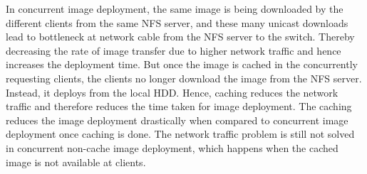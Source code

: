 \documentclass[a4paper,12pt]{article}
\begin{document}
In concurrent image deployment, the same image is being downloaded by the different clients from the same NFS server, and these many unicast downloads lead to bottleneck at network cable from the NFS server to the switch. Thereby decreasing the rate of image transfer due to higher network traffic and hence increases the deployment time. But once the image is cached in the concurrently requesting clients, the clients no longer download the image from the NFS server. Instead, it deploys from the local HDD. Hence, caching reduces the network traffic and therefore reduces the time taken for image deployment. The caching reduces the image deployment drastically when compared to concurrent image deployment once caching is done. The network traffic problem is still not solved in concurrent non-cache image deployment, which happens when the cached image is not available at clients.  
\end{document}

